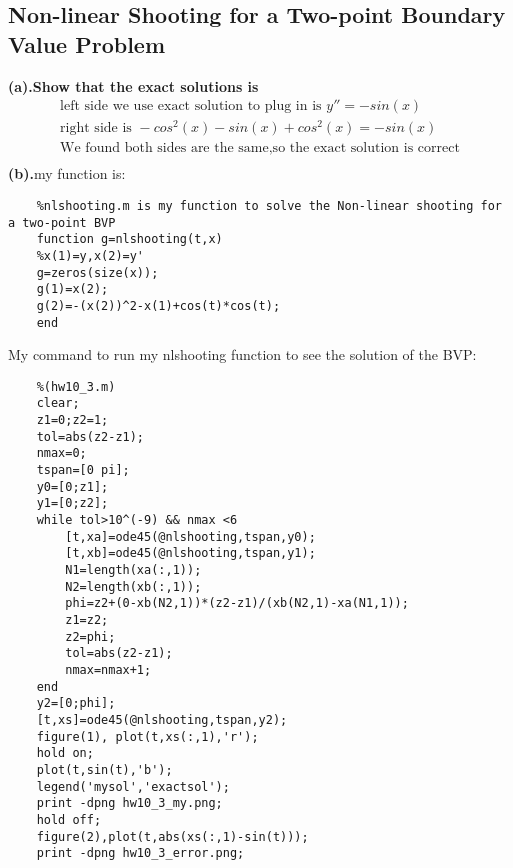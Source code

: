 \subsection{Non-linear Shooting for a Two-point Boundary Value Problem}
\textbf{(a).Show that the exact solutions is}
\[
\begin{aligned}
    \text{left side we use exact solution to plug in is }y''=-sin(x)\\
    \text{right side is }-cos^2(x)-sin(x)+cos^2(x)=-sin(x)\\
    \text{We found both sides are the same,so the exact solution is correct}\\    
\end{aligned}
\]
\textbf{(b).}my function is:
\begin{verbatim}
    %nlshooting.m is my function to solve the Non-linear shooting for a two-point BVP
    function g=nlshooting(t,x)
    %x(1)=y,x(2)=y'
    g=zeros(size(x));
    g(1)=x(2);
    g(2)=-(x(2))^2-x(1)+cos(t)*cos(t);
    end
\end{verbatim}
My command to run my nlshooting function to see the solution of the BVP:
\begin{verbatim}
    %(hw10_3.m)
    clear;
    z1=0;z2=1;
    tol=abs(z2-z1);
    nmax=0;
    tspan=[0 pi];
    y0=[0;z1];
    y1=[0;z2];
    while tol>10^(-9) && nmax <6
        [t,xa]=ode45(@nlshooting,tspan,y0);
        [t,xb]=ode45(@nlshooting,tspan,y1);
        N1=length(xa(:,1));
        N2=length(xb(:,1));
        phi=z2+(0-xb(N2,1))*(z2-z1)/(xb(N2,1)-xa(N1,1));
        z1=z2;
        z2=phi;
        tol=abs(z2-z1);
        nmax=nmax+1;
    end
    y2=[0;phi];
    [t,xs]=ode45(@nlshooting,tspan,y2);
    figure(1), plot(t,xs(:,1),'r');
    hold on;
    plot(t,sin(t),'b');
    legend('mysol','exactsol');
    print -dpng hw10_3_my.png;
    hold off;
    figure(2),plot(t,abs(xs(:,1)-sin(t)));
    print -dpng hw10_3_error.png;
\end{verbatim}
\newpage
